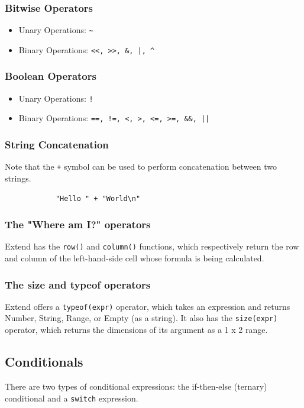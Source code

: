 		\subsubsection{Bitwise Operators}
			\begin{itemize}
				\item Unary Operations: \texttt{\~}
				\item Binary Operations: \texttt{<<, >>, \&, |, \^}
			\end{itemize}

		\subsubsection{Boolean Operators}
			\begin{itemize}
				\item Unary Operations: \texttt{!}
				\item Binary Operations: \texttt{==, !=, <, >, <=, >=, \&\&, ||}
			\end{itemize}

		\subsubsection{String Concatenation}
		Note that the \texttt{+} symbol can be used to perform concatenation between two strings.

		\begin{lstlisting}
			"Hello " + "World\n"
		\end{lstlisting}

		\subsubsection{The "Where am I?" operators}
		Extend has the \texttt{row()} and \texttt{column()} functions, which respectively return the row and column of the left-hand-side cell whose formula is being calculated.

		\subsubsection{The size and typeof operators}
		Extend offers a \texttt{typeof(expr)} operator, which takes an expression and returns Number, String, Range, or Empty (as a string). It also has the \texttt{size(expr)} operator, which returns the dimensions of its argument as a 1 x 2 range.


	\subsection{Conditionals}
	There are two types of conditional expressions: the if-then-else (ternary) conditional and a \texttt{switch} expression.

